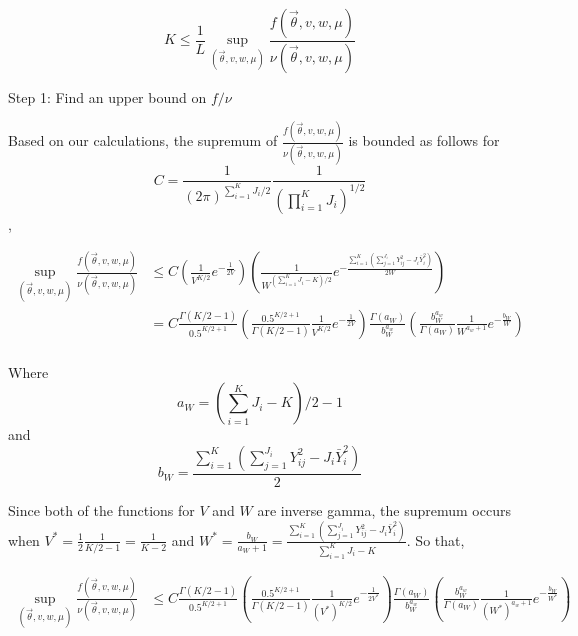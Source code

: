 \documentclass[
]{article}
\begin{document}
\[K\leq \frac{1}{L}\sup_{(\vec{\theta}, v, w, \mu)}\frac{f(\vec{\theta}, v, w, \mu)}{\nu(\vec{\theta}, v, w, \mu)}\]

Step 1: Find an upper bound on \(f/\nu\)

Based on our calculations, the supremum of
\(\frac{f(\vec{\theta}, v, w, \mu)}{\nu(\vec{\theta}, v, w, \mu)}\) is
bounded as follows for
\[C=\frac{1}{(2\pi)^{\sum_{i=1}^K J_i/2}} \frac{1}{(\prod_{i=1}^{K} J_i)^{1/2}}\],

\begin{align*}
    \sup_{(\vec{\theta}, v, w, \mu)}\frac{f(\vec{\theta}, v, w, \mu)}{\nu(\vec{\theta}, v, w, \mu)} &\leq C \left(\frac{1}{V^{K/2}}e^{-\frac{1}{2V}}\right)
    \left( \frac{1}{W^{(\sum_{i=1}^K J_i-K)/2}}e^{-\frac{\sum_{i=1}^K(\sum_{j=1}^{J_i} Y_{ij}^2 -J_i \bar{Y}_i^2)}{2W}} \right) \\
    &= C \frac{\Gamma(K/2-1)}{0.5^{K/2+1}}\left(\frac{0.5^{K/2+1}}{\Gamma(K/2-1)}\frac{1}{V^{K/2}}e^{-\frac{1}{2V}}\right)
    \frac{\Gamma(a_W)}{b_W^{a_w}}\left( \frac{b_W^{a_w}}{\Gamma(a_W)} \frac{1}{W^{a_w+1}}e^{-\frac{b_W}{W}} \right) \\
\end{align*}

Where \[a_W = (\sum_{i=1}^K J_i-K)/2 -1\] and
\[b_W=\frac{\sum_{i=1}^K(\sum_{j=1}^{J_i} Y_{ij}^2 -J_i \bar{Y}_i^2)}{2}\]

Since both of the functions for \(V\) and \(W\) are inverse gamma, the
supremum occurs when \(V^*=\frac{1}{2}\frac{1}{K/2-1}=\frac{1}{K-2}\)
and
\(W^* = \frac{b_W}{a_W+1}=\frac{\sum_{i=1}^K(\sum_{j=1}^{J_i} Y_{ij}^2 -J_i \bar{Y}_i^2)}{\sum_{i=1}^K J_i-K}\).
So that,

\begin{align*}
    \sup_{(\vec{\theta}, v, w, \mu)}\frac{f(\vec{\theta}, v, w, \mu)}{\nu(\vec{\theta}, v, w, \mu)} &\leq C \frac{\Gamma(K/2-1)}{0.5^{K/2+1}}\left(\frac{0.5^{K/2+1}}{\Gamma(K/2-1)}\frac{1}{(V^*)^{K/2}}e^{-\frac{1}{2V^*}}\right)
    \frac{\Gamma(a_W)}{b_W^{a_w}}\left( \frac{b_W^{a_w}}{\Gamma(a_W)} \frac{1}{(W^*)^{a_w+1}}e^{-\frac{b_W}{W^*}} \right) \\
\end{align*}
\end{document}
